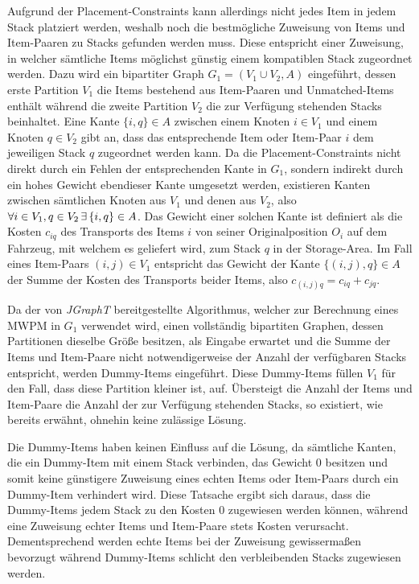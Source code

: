 Aufgrund der Placement-Constraints kann allerdings nicht jedes Item in jedem Stack platziert werden, weshalb noch die bestmögliche Zuweisung von
Items und Item-Paaren zu Stacks gefunden werden muss. Diese entspricht einer Zuweisung, in welcher sämtliche Items möglichst günstig einem
kompatiblen Stack zugeordnet werden. Dazu wird ein bipartiter Graph $G_1 = (V_1 \cup V_2, A)$ eingeführt, dessen erste Partition $V_1$ die Items bestehend aus Item-Paaren und Unmatched-Items enthält während die zweite Partition $V_2$ die zur Verfügung stehenden Stacks beinhaltet.
Eine Kante $\{i, q\} \in A$ zwischen einem Knoten $i \in V_1$ und einem Knoten $q \in V_2$ gibt an, dass das entsprechende Item oder Item-Paar $i$ dem jeweiligen Stack $q$ zugeordnet werden kann. Da die Placement-Constraints nicht direkt durch ein Fehlen der entsprechenden Kante in $G_1$, sondern indirekt durch ein hohes Gewicht ebendieser Kante umgesetzt werden, existieren Kanten zwischen sämtlichen Knoten
aus $V_1$ und denen aus $V_2$, also $\forall i \in V_1, q \in V_2 \thinspace \exists \thinspace \{i, q\} \in A$.
Das Gewicht einer solchen Kante ist definiert als die Kosten $c_{iq}$ des Transports des Items $i$ von seiner Originalposition $O_i$ auf dem Fahrzeug, mit welchem es geliefert wird, zum Stack $q$
in der Storage-Area. Im Fall eines Item-Paars $(i, j) \in V_1$ entspricht das
Gewicht der Kante $\{(i, j), q\} \in A$ der Summe der Kosten des Transports beider Items, also $c_{(i, j)q} = c_{iq} + c_{jq}$.

Da der von \textit{JGraphT} bereitgestellte Algorithmus, welcher zur Berechnung eines \textsc{MWPM} in $G_1$ verwendet wird,
einen vollständig bipartiten Graphen, dessen Partitionen dieselbe Größe besitzen, als Eingabe erwartet und die Summe der Items und Item-Paare
nicht notwendigerweise der Anzahl der verfügbaren Stacks entspricht, werden Dummy-Items eingeführt.
Diese Dummy-Items füllen $V_1$ für den Fall, dass diese Partition kleiner ist, auf.
Übersteigt die Anzahl der Items und Item-Paare die Anzahl der zur Verfügung stehenden Stacks, so existiert,
wie bereits erwähnt, ohnehin keine zulässige Lösung.

Die Dummy-Items haben keinen Einfluss auf die Lösung, da sämtliche Kanten, die ein Dummy-Item mit einem Stack verbinden,
das Gewicht $0$ besitzen und somit keine günstigere Zuweisung eines echten Items oder Item-Paars durch ein Dummy-Item
verhindert wird. Diese Tatsache ergibt sich daraus, dass die Dummy-Items jedem Stack zu den Kosten $0$ zugewiesen
werden können, während eine Zuweisung echter Items und Item-Paare stets Kosten verursacht. Dementsprechend werden
echte Items bei der Zuweisung gewissermaßen bevorzugt während Dummy-Items schlicht den verbleibenden Stacks zugewiesen werden.


